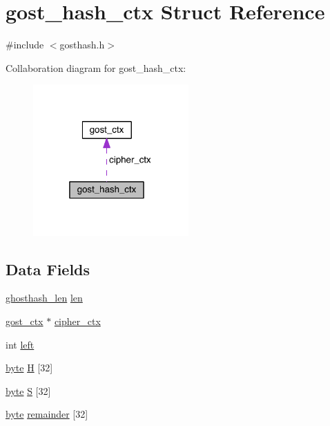 \hypertarget{structgost__hash__ctx}{}\section{gost\+\_\+hash\+\_\+ctx Struct Reference}
\label{structgost__hash__ctx}


{\ttfamily \#include $<$gosthash.\+h$>$}



Collaboration diagram for gost\+\_\+hash\+\_\+ctx\+:\nopagebreak
\begin{figure}[H]
\begin{center}
\leavevmode
\includegraphics[width=169pt]{structgost__hash__ctx__coll__graph}
\end{center}
\end{figure}
\subsection*{Data Fields}
\begin{DoxyCompactItemize}
\item 
\hyperlink{gosthash_8h_a034efd2af31702baaa22333a951cea11}{ghosthash\+\_\+len} \hyperlink{structgost__hash__ctx_ad61a1a3b4e1d86137145ae9693b1facc}{len}
\item 
\hyperlink{structgost__ctx}{gost\+\_\+ctx} $\ast$ \hyperlink{structgost__hash__ctx_a53ce32809547ccdb13c974809036a9c4}{cipher\+\_\+ctx}
\item 
int \hyperlink{structgost__hash__ctx_ad8f5e19e19f12974c9713e920ec54331}{left}
\item 
\hyperlink{gost89_8h_a0c8186d9b9b7880309c27230bbb5e69d}{byte} \hyperlink{structgost__hash__ctx_a8a7c23be1a5d440d2c1483a435be5b0b}{H} \mbox{[}32\mbox{]}
\item 
\hyperlink{gost89_8h_a0c8186d9b9b7880309c27230bbb5e69d}{byte} \hyperlink{structgost__hash__ctx_a7c3f901539cb0cc560d93e97619a3981}{S} \mbox{[}32\mbox{]}
\item 
\hyperlink{gost89_8h_a0c8186d9b9b7880309c27230bbb5e69d}{byte} \hyperlink{structgost__hash__ctx_a5c05fab3a0e5b29913abebe952d7c58c}{remainder} \mbox{[}32\mbox{]}
\end{DoxyCompactItemize}



